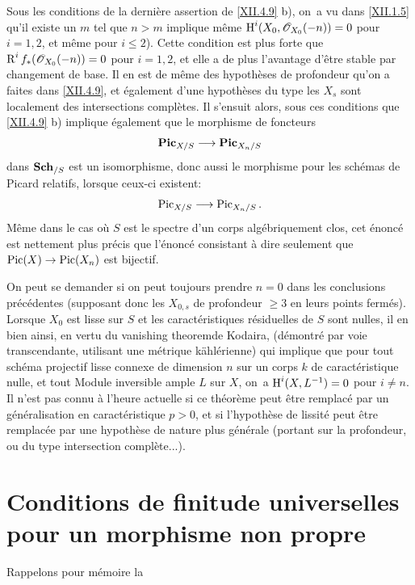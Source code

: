 \begin{remarque} \label{XII.4.10}
Sous les conditions de la derni\`ere assertion de \ref{XII.4.9} b), on~a vu dans \ref{XII.1.5} qu'il existe un $m$ tel que $n>m$ implique m\^eme $\operatorname{H}^i(X_0, {\mathscr O}_{X_0}(-n))=0$ pour $i=1, 2$, et m\^eme pour $i\leq 2$). Cette condition est plus forte que $\operatorname{R}^if_{\ast}({\mathscr O}_{X_0}(-n))=0$ pour $i=1, 2$, et elle a de plus l'avantage d'\^etre stable par changement de base. Il en est de m\^eme des hypoth\`eses de profondeur qu'on a faites dans \ref{XII.4.9}, et \'egalement d'une hypoth\`eses du type \og les $X_s$ sont localement des intersections compl\`etes\fg. Il s'ensuit alors, sous ces conditions que \ref{XII.4.9} b) implique \'egalement que le morphisme de foncteurs
\[
\SheafPic_{X/S}\to \SheafPic_{X_n/S}
\]
dans $\operatorname{\mathbf{Sch}}_{/S}$ est un isomorphisme, donc aussi le morphisme pour les sch\'emas de Picard relatifs, lorsque ceux-ci existent:
\[
\Pic_{X/S}\to \Pic_{X_n/S}.
\]
M\^eme dans le cas o\`u $S$ est le spectre d'un corps alg\'ebriquement clos, cet \'enonc\'e est nettement plus pr\'ecis que l'\'enonc\'e consistant \`a dire seulement que $\Pic(X)\to \Pic(X_n)$ est bijectif.

On peut se demander si on peut toujours prendre $n=0$ dans les conclusions pr\'ec\'edentes (supposant donc les $X_{0, s}$ de profondeur $\geq 3$ en leurs points ferm\'es). Lorsque $X_0$ est lisse sur $S$ et les caract\'eristiques r\'esiduelles de $S$ sont nulles, il en bien ainsi, en vertu du \og vanishing theorem\fg de Kodaira, (d\'emontr\'e par voie transcendante, utilisant une m\'etrique k\"ahl\'erienne) qui implique que pour tout sch\'ema projectif lisse connexe de dimension $n$ sur un corps $k$ de caract\'eristique nulle, et tout Module inversible ample $L$ sur $X$, on~a $\operatorname{H}^i(X, L^{-1})=0$ pour $i\neq n$. Il n'est pas connu \`a l'heure actuelle si ce th\'eor\`eme peut \^etre remplac\'e par un g\'en\'eralisation en caract\'eristique $p>0$, et si l'hypoth\`ese de lissit\'e peut \^etre remplac\'ee par une hypoth\`ese de nature plus g\'en\'erale (portant sur la profondeur, ou du type \og intersection compl\`ete\fg...).
\end{remarque}

\section[Conditions de finitude universelles]
{Conditions de finitude universelles pour un morphisme non propre} \label{XII.5} Rappelons pour m\'emoire la \setcounter{equation}{25}

